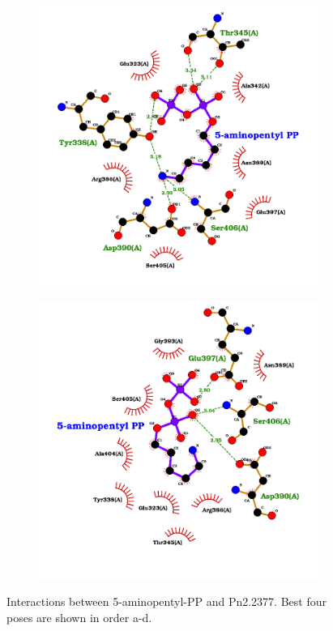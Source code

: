 \documentclass[12pt]{article}
\begin{document}
\begin{figure}[h!]
\begin{subfigure}[h!]{0.35\textwidth}
			\caption{}
		\end{subfigure}
		\hfill
		\begin{subfigure}[h!]{0.35\textwidth}
			\hspace{2cm}
			\includegraphics[width=\textwidth]{../9/Dock/best3.png}
			\caption{}
		\end{subfigure}
		\hfill
		\begin{subfigure}[h!]{0.35\textwidth}
			\hspace{-2cm}
			\includegraphics[width=\textwidth]{../9/Dock/best4.png}
			\caption{}
		\end{subfigure}
		\hfill
		\caption[Interactions between 5-aminopentyl-PP and Pn2.2377]{\centering Interactions between 5-aminopentyl-PP and Pn2.2377. Best four poses are shown in order a-d.}
		\label{fig9_3}
	\end{figure}
\end{document}
